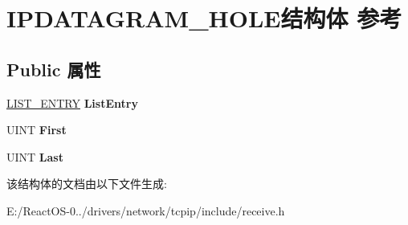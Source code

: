 \hypertarget{struct_i_p_d_a_t_a_g_r_a_m___h_o_l_e}{}\section{I\+P\+D\+A\+T\+A\+G\+R\+A\+M\+\_\+\+H\+O\+L\+E结构体 参考}
\label{struct_i_p_d_a_t_a_g_r_a_m___h_o_l_e}
\subsection*{Public 属性}
\begin{DoxyCompactItemize}
\item 
\mbox{\label{struct_i_p_d_a_t_a_g_r_a_m___h_o_l_e_a5f7095128412e5db2200595426f8c4e5}} 
\hyperlink{struct___l_i_s_t___e_n_t_r_y}{L\+I\+S\+T\+\_\+\+E\+N\+T\+RY} {\bfseries List\+Entry}
\item 
\mbox{\label{struct_i_p_d_a_t_a_g_r_a_m___h_o_l_e_ac65a21d0e1cc3868b20add3f150fcbc4}} 
U\+I\+NT {\bfseries First}
\item 
\mbox{\label{struct_i_p_d_a_t_a_g_r_a_m___h_o_l_e_ae80175947941955bcdee905df129cc12}} 
U\+I\+NT {\bfseries Last}
\end{DoxyCompactItemize}


该结构体的文档由以下文件生成\+:\begin{DoxyCompactItemize}
\item 
E\+:/\+React\+O\+S-\/0../drivers/network/tcpip/include/receive.\+h\end{DoxyCompactItemize}
